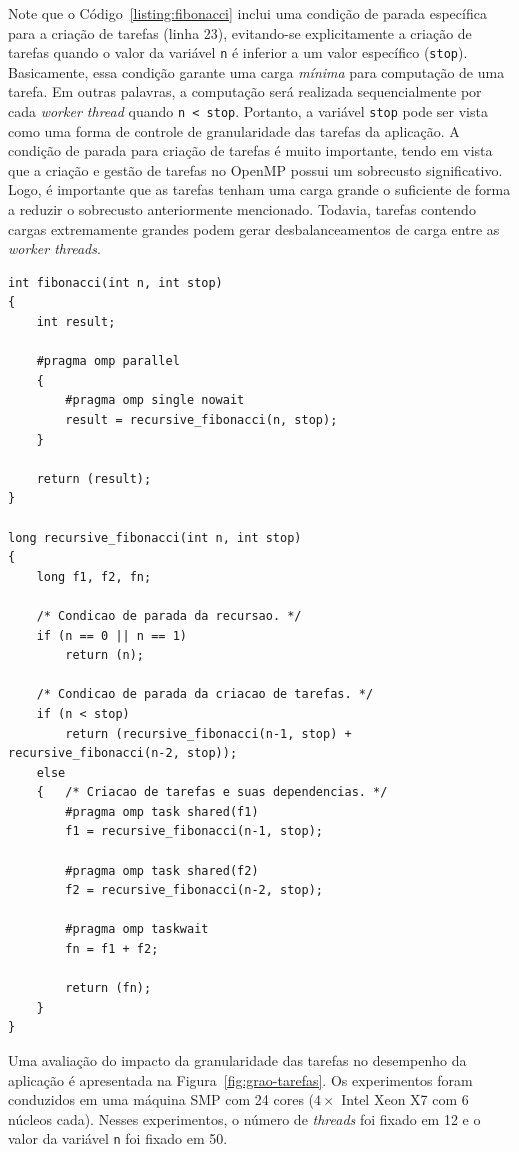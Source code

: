 \documentclass{SBCbookchapter}
\begin{document}
	Note que o Código~\ref{listing:fibonacci} inclui uma condição de parada específica para a criação de tarefas (linha 23),
	evitando-se explicitamente a criação de tarefas quando o valor da variável \texttt{n} é inferior a um valor específico (\texttt{stop}). 
	Basicamente, essa condição garante uma carga \textit{mínima} para computação de uma tarefa. Em outras palavras, a
	computação será realizada sequencialmente por cada \textit{worker thread} quando \texttt{n < stop}. Portanto,
	a variável \texttt{stop} pode ser vista como uma forma de controle de granularidade das tarefas da aplicação.
	A condição de parada para criação de tarefas é muito importante, tendo em vista que a criação e gestão de tarefas no
	OpenMP possui um sobrecusto significativo. Logo, é importante que as tarefas tenham uma carga grande o suficiente de forma
	a reduzir o sobrecusto anteriormente mencionado. Todavia, tarefas contendo cargas extremamente grandes podem gerar
	desbalanceamentos de carga entre as \textit{worker threads}.

\begin{lstlisting}[frame=single, caption=Exemplo de uma implementação recursiva simples da soma da sequencia de Fibonacci
usando tarefas., label=listing:fibonacci]
int fibonacci(int n, int stop)
{
	int result;
	
	#pragma omp parallel
  	{
		#pragma omp single nowait
		result = recursive_fibonacci(n, stop);
	}
		
	return (result);
}

long recursive_fibonacci(int n, int stop)
{
	long f1, f2, fn;

	/* Condicao de parada da recursao. */
	if (n == 0 || n == 1) 
		return (n);

	/* Condicao de parada da criacao de tarefas. */
	if (n < stop) 
		return (recursive_fibonacci(n-1, stop) + recursive_fibonacci(n-2, stop));
	else
	{	/* Criacao de tarefas e suas dependencias. */
		#pragma omp task shared(f1)
		f1 = recursive_fibonacci(n-1, stop);

		#pragma omp task shared(f2)
		f2 = recursive_fibonacci(n-2, stop);
		
		#pragma omp taskwait
		fn = f1 + f2;
			
		return (fn);
	}
}
\end{lstlisting}

	Uma avaliação do impacto da granularidade das tarefas no desempenho da aplicação é apresentada na
	Figura~\ref{fig:grao-tarefas}. Os experimentos foram conduzidos em uma máquina SMP com 24 cores
	($4 \times$ Intel Xeon X7 com 6 núcleos cada). Nesses experimentos, o número de \textit{threads} foi fixado
	em 12 e o valor da variável \texttt{n} foi fixado em 50.
\end{document}
